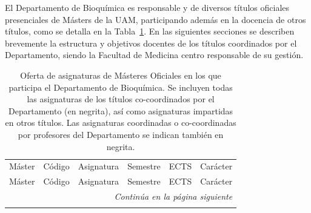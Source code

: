 \documentclass[
  11pt,
  a4paper,
  twoside]{scrreprt}
\begin{document}
El Departamento de Bioquímica es responsable y de diversos títulos
oficiales presenciales de Másters de la UAM, participando además en la
docencia de otros títulos, como se detalla en la
Tabla~\ref{tbl-masters}. En las siguientes secciones se describen
brevemente la estructura y objetivos docentes de los títulos coordinados
por el Departamento, siendo la Facultad de Medicina centro responsable
de su gestión.

\begin{longtable}{
p{2.75cm}
>{\centering\arraybackslash}p{1.15cm}
p{6.4cm}
>{\centering\arraybackslash}p{1.2cm}
>{\centering\arraybackslash}p{0.9cm}
p{1.875cm}}

\caption{\label{tbl-masters}Oferta de asignaturas de Másteres Oficiales en los que participa el Departamento de Bioquímica. Se incluyen todas las asignaturas de los títulos co-coordinados por el Departamento (en negrita), así como asignaturas impartidas en otros títulos. Las asignaturas coordinadas o co-coordinadas por profesores del Departamento se indican también en negrita.}

\tabularnewline

  \\
\hline
Máster & Código & Asignatura & Semestre & ECTS & Carácter \\
\hline
\endfirsthead
\hline
Máster & Código & Asignatura & Semestre & ECTS & Carácter \\
\hline
\endhead

\hline
\multicolumn{6}{r}{\textit{Continúa en la página siguiente}} \\
\endfoot

\hline
\endlastfoot



\end{longtable}
\end{document}
